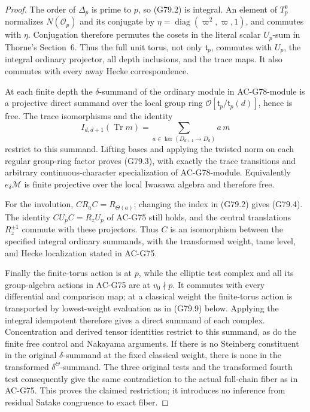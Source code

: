 \begin{proof}
The order of \(\Delta_p\) is prime to \(p\), so (G79.2) is
integral.  An element of \(T_p^0\) normalizes \(N(\mathcal O_p)\)
and its conjugate by
\(\eta=\operatorname{diag}(\varpi^2,\varpi,1)\), and commutes
with \(\eta\).  Conjugation therefore permutes the cosets in
the literal scalar \(U_p\)-sum in Thorne's Section~6.
Thus the full unit torus, not only \(\mathfrak t_p\), commutes
with \(U_p\), the integral ordinary projector, all depth
inclusions, and the trace maps.  It also commutes with every
away Hecke correspondence.

At each finite depth the \(\delta\)-summand of the ordinary
module in AC-G78-module is a projective direct summand over
the local group ring
\(\mathcal O[\mathfrak t_p/\mathfrak t_p(d)]\), hence is free.
The trace isomorphisms and the identity
\[
 I_{d,d+1}(\operatorname{Tr}m)
       =\sum_{a\in\ker(D_{d+1}\to D_d)}a\,m
\]
restrict to this summand.  Lifting bases and applying the
twisted norm on each regular group-ring factor proves
(G79.3), with exactly the trace transitions and arbitrary
continuous-character specialization of AC-G78-module.
Equivalently \(e_\delta\mathscr M\) is finite projective over
the local Iwasawa algebra and therefore free.

For the involution, \(C R_a C=R_{\Theta(a)}\); changing the
index in (G79.2) gives (G79.4).  The identity
\(C U_p C=R_zU_p\) of AC-G75 still holds, and the central
translations \(R_z^{\pm1}\) commute with these projectors.
Thus \(C\) is an isomorphism between the specified integral
ordinary summands, with the transformed weight, tame level,
and Hecke localization stated in AC-G75.

Finally the finite-torus action is at \(p\), while the
elliptic test complex and all its group-algebra actions in
AC-G75 are at \(v_0\nmid p\).  It commutes with every
differential and comparison map; at a classical weight the
finite-torus action is transported by lowest-weight evaluation
as in (G79.9) below.  Applying the integral
idempotent therefore gives a direct summand of each complex.
Concentration and derived tensor identities restrict to
this summand, as do the finite free control and Nakayama
arguments.  If there is no Steinberg constituent in the
original \(\delta\)-summand at the fixed classical weight,
there is none in the transformed
\(\delta^\Theta\)-summand.  The three original tests and the
transformed fourth test consequently give the same
contradiction to the actual full-chain fiber as in AC-G75.
This proves the claimed restriction; it introduces no
inference from residual Satake congruence to exact fiber.
\end{proof}

